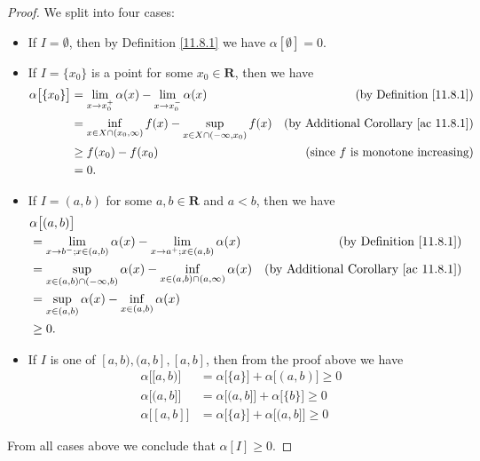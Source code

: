 \begin{proof}
    We split into four cases:
    \begin{itemize}
        \item If \(I = \emptyset\), then by Definition \ref{11.8.1} we have \(\alpha[\emptyset] = 0\).
        \item If \(I = \{x_0\}\) is a point for some \(x_0 \in \mathbf{R}\), then we have
              \begin{align*}
                  \alpha\big[\{x_0\}\big] & = \lim_{x \to x_0^+} \alpha(x) - \lim_{x \to x_0^-} \alpha(x)                      & \text{(by Definition \ref{11.8.1})}              \\
                                          & = \inf_{x \in X \cap (x_0, \infty)} f(x) - \sup_{x \in X \cap (-\infty, x_0)} f(x) & \text{(by Additional Corollary \ref{ac 11.8.1})} \\
                                          & \geq f(x_0) - f(x_0)                                                               & \text{(since \(f\) is monotone increasing)}      \\
                                          & = 0.
              \end{align*}
        \item If \(I = (a, b)\) for some \(a, b \in \mathbf{R}\) and \(a < b\), then we have
              \begin{align*}
                   & \alpha\big[(a, b)\big]                                                                                                                                \\
                   & = \lim_{x \to b^- ; x \in (a, b)} \alpha(x) - \lim_{x \to a^+ ; x \in (a, b)} \alpha(x)            & \text{(by Definition \ref{11.8.1})}              \\
                   & = \sup_{x \in (a, b) \cap (-\infty, b)} \alpha(x) - \inf_{x \in (a, b) \cap (a, \infty)} \alpha(x) & \text{(by Additional Corollary \ref{ac 11.8.1})} \\
                   & = \sup_{x \in (a, b)} \alpha(x) - \inf_{x \in (a, b)} \alpha(x)                                                                                       \\
                   & \geq 0.
              \end{align*}
        \item If \(I\) is one of \([a, b), (a, b], [a, b]\), then from the proof above we have
              \begin{align*}
                  \alpha\big[[a, b)\big] & = \alpha\big[\{a\}\big] + \alpha\big[(a, b)\big] \geq 0 \\
                  \alpha\big[(a, b]\big] & = \alpha\big[(a, b]\big] + \alpha\big[\{b\}\big] \geq 0 \\
                  \alpha\big[[a, b]\big] & = \alpha\big[\{a\}\big] + \alpha\big[(a, b]\big] \geq 0
              \end{align*}
    \end{itemize}
    From all cases above we conclude that \(\alpha[I] \geq 0\).
\end{proof}

